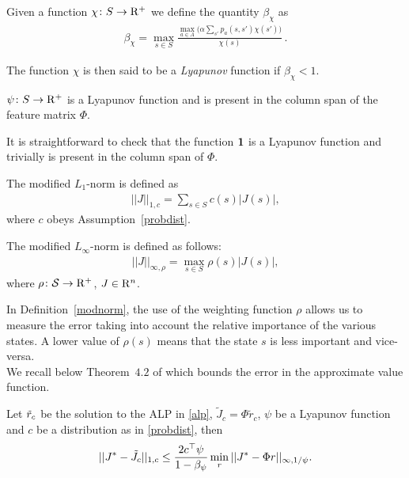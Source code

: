 \begin{definition}
Given a function $\chi\colon S\rightarrow \mathrm{R}^+$ we define the quantity $\beta_{\chi}$ as
\begin{align*}
\beta_{\chi}=\max_{s \in S} \frac{\underset{a \in A}{\max}\big(\alpha\sum_{s'}p_a(s,s')\chi(s')\big)}{\chi(s)}\,.
\end{align*}
\end{definition}
\begin{definition}
The function $\chi$ is then said to be a \emph{Lyapunov} function if $\beta_{\chi}<1$.
\end{definition}
\begin{assumption}\label{lyap}
$\psi\colon S \rightarrow \mathrm{R}^+$ is a Lyapunov function and is present in the column span of the feature matrix $\Phi$.
\end{assumption}
It is straightforward to check that the function $\mathbf{1}$ is a Lyapunov function and trivially is present in the column span of $\Phi$. 
\begin{definition}\label{modlone}
The modified $L_1$-norm is defined as 
\begin{align*}
||J||_{1,c}=\sum_{s \in S} c(s)|J(s)|,
\end{align*}
where $c$ obeys Assumption~\ref{probdist}.
\end{definition}
\begin{definition}\label{modnorm}
The modified $L_\infty$-norm is defined as follows:  
\begin{align*}
||J||_{\infty,\rho}=\max_{s \in S} \rho(s) |J(s)|,
\end{align*}
where $\rho \colon \mathcal{S} \rightarrow \mathrm{R}^+$, $J\in \mathrm{R}^n$.
\end{definition}
In Definition~\ref{modnorm}, the use of the weighting function $\rho$ allows us to measure the error taking into account the relative importance of the various states. A lower value of $\rho(s)$ means that the state $s$ is less important and vice-versa.\\
We recall below Theorem~$4.2$ of \cite{ALP} which bounds the error in the approximate value function.
\begin{theorem}\label{restateval}
Let $\tilde{r}_c$ be the solution to the ALP in \eqref{alp}, $\tilde{J}_c=\Phi \tilde{r}_c$, $\psi$ be a Lyapunov function and $c$ be a distribution as in \eqref{probdist}, then 
\begin{align*}
||J^*-\tilde{J}_c||_{1,c}\leq \frac{2c^\top \psi}{1-\beta_{\psi}}\min_{r}||J^*-\Phi r||_{\infty,1/\psi}.
\end{align*}
\end{theorem}
